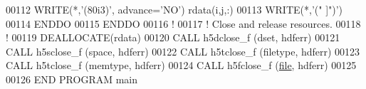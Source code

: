 \begin{DoxyCode}
00112         \textcolor{keyword}{WRITE}(*,\textcolor{stringliteral}{'(80i3)'}, advance=\textcolor{stringliteral}{'NO'}) rdata(i,j,:)
00113         \textcolor{keyword}{WRITE}(*,\textcolor{stringliteral}{'(" ]")'})
00114 \textcolor{keywordflow}{     ENDDO}
00115 \textcolor{keywordflow}{  ENDDO}
00116   \textcolor{comment}{!}
00117   \textcolor{comment}{! Close and release resources.}
00118   \textcolor{comment}{!}
00119   \textcolor{keyword}{DEALLOCATE}(rdata)
00120   \textcolor{keyword}{CALL }h5dclose\_f (dset, hdferr)
00121   \textcolor{keyword}{CALL }h5sclose\_f (space, hdferr)
00122   \textcolor{keyword}{CALL }h5tclose\_f (filetype, hdferr)
00123   \textcolor{keyword}{CALL }h5tclose\_f (memtype, hdferr)
00124   \textcolor{keyword}{CALL }h5fclose\_f (\hyperlink{structfile}{file}, hdferr)
00125 
00126 \textcolor{keyword}{END PROGRAM }main
\end{DoxyCode}
